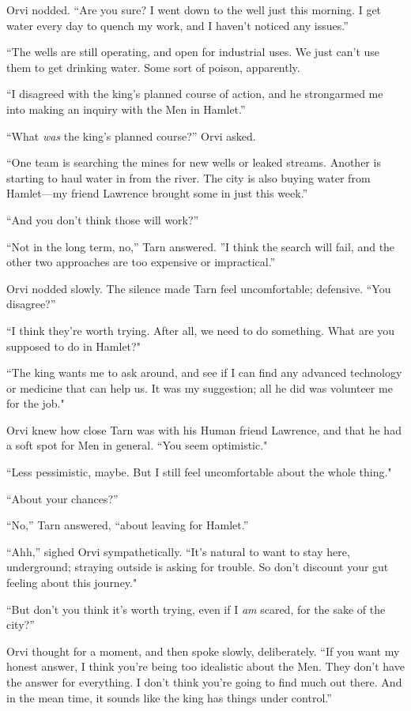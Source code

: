 Orvi nodded.  ``Are you sure? I went down to the well just this morning.  I get water every day to quench my work, and I haven't noticed any issues.''

``The wells are still operating, and open for industrial uses.  We just can't use them to get drinking water.  Some sort of poison, apparently.

``I disagreed with the king's planned course of action, and he strongarmed me into making an inquiry with the Men in Hamlet.''

``What \emph{was} the king's planned course?'' Orvi asked.

``One team is searching the mines for new wells or leaked streams.  Another is starting to haul water in from the river.  The city is also buying water from Hamlet---my friend Lawrence brought some in just this week.''

``And you don't think those will work?''

``Not in the long term, no,'' Tarn answered.  ''I think the search will fail, and the other two approaches are too expensive or impractical.''

Orvi nodded slowly.  The silence made Tarn feel uncomfortable; defensive.  ``You disagree?''

``I think they're worth trying.  After all, we need to do something.  What are you supposed to do in Hamlet?"

``The king wants me to ask around, and see if I can find any advanced technology or medicine that can help us.  It was my suggestion; all he did was volunteer me for the job."

Orvi knew how close Tarn was with his Human friend Lawrence, and that he had a soft spot for Men in general.  ``You seem optimistic."

``Less pessimistic, maybe.  But I still feel uncomfortable about the whole thing."

``About your chances?''

``No,'' Tarn answered, ``about leaving for Hamlet.''

``Ahh,'' sighed Orvi sympathetically.  ``It's natural to want to stay here, underground; straying outside is asking for trouble.  So don't discount your gut feeling about this journey."

``But don't you think it's worth trying, even if I \emph{am} scared, for the sake of the city?''

Orvi thought for a moment, and then spoke slowly, deliberately.  ``If you want my honest answer, I think you're being too idealistic about the Men.  They don't have the answer for everything.  I don't think you're going to find much out there.  And in the mean time, it sounds like the king has things under control.''

